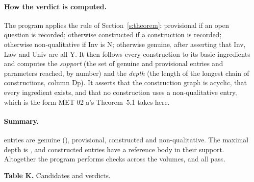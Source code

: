 \paragraph{How the verdict is computed.} The program applies the rule of Section~\ref{s:theorem}: provisional if an open question is recorded; otherwise constructed if a construction is recorded; otherwise non-qualitative if Inv is N; otherwise genuine, after asserting that Inv, Law and Univ are all Y. It then follows every construction to its basic ingredients and computes the \emph{support} (the set of genuine and provisional entries and parameters reached, by number) and the \emph{depth} (the length of the longest chain of constructions, column Dp). It asserts that the construction graph is acyclic, that every ingredient exists, and that no construction uses a non-qualitative entry, which is the form MET-02-a's Theorem~5.1 takes here.

\paragraph{Summary.} \vvNKgenuine{} entries are genuine (\vvKGenuineList), \vvNKprovisional{} provisional, \vvNKconstructed{} constructed and \vvNKnonqual{} non-qualitative. The maximal depth is \vvNKmaxdepth{}, and \vvNKframe{} constructed entries have a reference body in their support. Altogether the program performs \vvNChecks{} checks across the volumes, and all pass.

\begin{center}\textbf{Table K.} Candidates and verdicts.\end{center}

